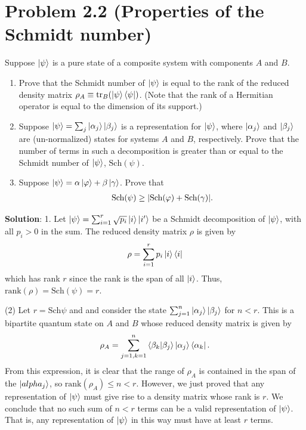 \documentclass{book}
\begin{document}
\section*{Problem 2.2 (Properties of the Schmidt number)}
    Suppose $\ket{\psi}$ is a pure state of a composite system with components $A$ and $B$. 
    \begin{enumerate}
        \item Prove that the Schmidt number of $\ket{\psi}$ is equal to the rank of the reduced density matrix $\rho_A \equiv \tr_B(\ket{\psi}\bra{\psi})$. (Note that the rank of a Hermitian operator is equal to the dimension of its support.)
        \item Suppose $\ket{\psi} = \sum_j \ket{\alpha_j}\ket{\beta_j}$ is a representation for $\ket{\psi}$, where $\ket{\alpha_j}$ and $\ket{\beta_j}$ are (un-normalized) states for systems $A$ and $B$, respectively. Prove that the number of terms in such a decomposition is greater than or equal to the Schmidt number of $\ket{\psi}$, $\text{Sch}(\psi)$.
        \item Suppose $\ket{\psi} = \alpha \ket{\varphi} + \beta \ket{\gamma}$. Prove that
        \begin{align}
            \text{Sch}(\psi) \geq \abs{\text{Sch}(\varphi)+\text{Sch}(\gamma)}.
        \end{align}
    \end{enumerate}

    \textbf{Solution}: 1. Let $\ket{\psi} = \sum_{i=1}^r \sqrt{p_i} \ket{i}\ket{i'}$ be a Schmidt decomposition of $\ket{\psi}$, with all $p_i > 0$ in the sum. The reduced density matrix $\rho$ is given by 
    \begin{align}
        \rho = \sum_{i=1}^r p_i \ket{i}\bra{i}
    \end{align}
    which has rank $r$ since the rank is the span of all $\ket{i}$. Thus, $\text{rank}(\rho) = \text{Sch}(\psi) = r$.

    (2) Let $r = \text{Sch}{\psi}$ and and consider the state $\sum_{j=1}^n \ket{\alpha_j}\ket{\beta_j}$ for $n < r$. This is a bipartite quantum state on $A$ and $B$ whose reduced density matrix is given by
    \begin{align}
        \rho_A = \sum_{j=1, k=1}^n \bra{\beta_k}\ket{\beta_j} \ket{\alpha_j}\bra{\alpha_k}.
    \end{align}
    From this expression, it is clear that the range of $\rho_A$ is contained in the span of the $\ket{alpha_j}$, so $\text{rank}(\rho_A) \leq n < r$. However, we just proved that any representation of $\ket{\psi}$ must give rise to a density matrix whose rank is $r$. We conclude that no such sum of $n < r$ terms can be a valid representation of $\ket{\psi}$. That is, any representation of $\ket{\psi}$ in this way must have at least $r$ terms. 
\end{document}
